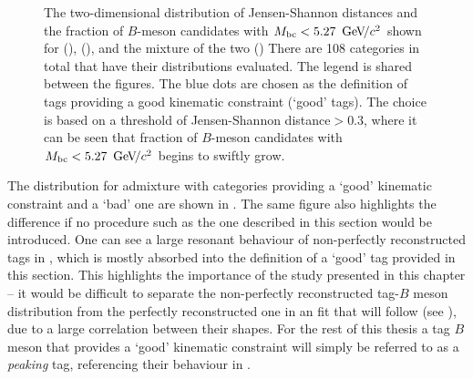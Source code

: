 \begin{figure}[htbp!]
    \centering
    \caption{\label{fig:good_tags_jsdists} The two-dimensional distribution of Jensen-Shannon distances and the fraction of $B$-meson candidates with ${M_{\mathrm{bc}}}<5.27~{\mathrm{\,Ge\kern -0.1em V\!/}c^2}$
    shown for \BptoXsgamma (), \BztoXsgamma (), and the mixture of the two ()
    There are 108 categories in total that have their \Mbc distributions evaluated.
    The legend is shared between the figures.
    The blue dots are chosen as the definition of tags providing a good kinematic constraint (`good' tags).
    The choice is based on a threshold of Jensen-Shannon distance$>0.3$, where it can be seen that fraction of $B$-meson candidates with ${M_{\mathrm{bc}}}<5.27~{\mathrm{\,Ge\kern -0.1em V\!/}c^2}$ begins to swiftly grow.
    }
\end{figure}

The \Mbc distribution for \BtoXsgamma admixture with categories providing a `good' kinematic constraint and a `bad' one are shown in .
The same figure also highlights the difference if no procedure such as the one described in this section would be introduced.
One can see a large resonant behaviour of non-perfectly reconstructed tags in , which is mostly absorbed into the definition of a `good' tag provided in this section.
This highlights the importance of the study presented in this chapter -- it would be difficult to separate the non-perfectly reconstructed tag-$B$ meson distribution from the perfectly reconstructed one in an \Mbc fit that will follow (see ), due to a large correlation between their shapes.
For the rest of this thesis a tag $B$ meson that provides a `good' kinematic constraint will simply be referred to as a \textit{peaking} tag, referencing their behaviour in \Mbc.

